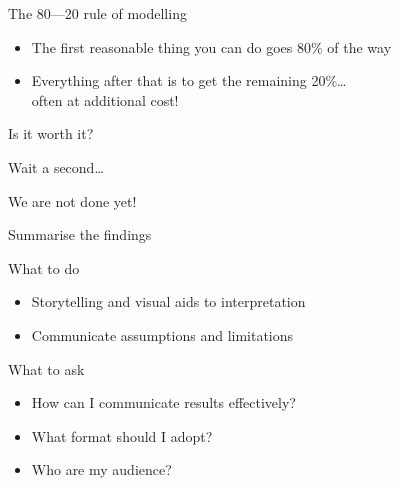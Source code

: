 {
\begin{frame}{The 80---20 rule of modelling}
    \begin{itemize}
        \item The first reasonable thing you can do goes 80\% of the way
        \item Everything after that is to get the remaining 20\%\ldots \\
              often at additional cost!
    \end{itemize}
    \vfill\pause
    \begin{center}
        \Large%
        Is it worth it?
    \end{center}
\end{frame}}

\begin{frame}{Wait a second\ldots}
    \begin{center}
        \LARGE%
        We are not done yet!
    \end{center}
\end{frame}

\begin{frame}[t]{Summarise the findings}
    \begin{block}{What to do}
        \begin{itemize}
            \item Storytelling and visual aids to interpretation
            \item Communicate assumptions and limitations
        \end{itemize}
    \end{block}
    \vfill
    \begin{block}{What to ask}
        \begin{itemize}
            \item How can I communicate results effectively?
            \item What format should I adopt?
            \item Who are my audience?
        \end{itemize}
    \end{block}
\end{frame}

